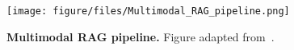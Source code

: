 \begin{figure}[t]
    \centering
    \texttt{[image: figure/files/Multimodal\_RAG\_pipeline.png]}
    \caption{\textbf{Multimodal RAG pipeline.} Figure adapted from~\cite{chen2024mllm}.}
    \label{fig:pipeline_fig}
\vspace{-0.2in}
\end{figure}

